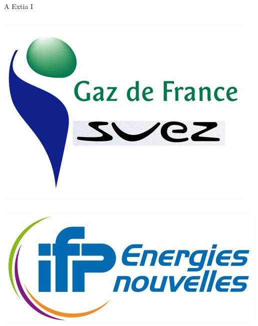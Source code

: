 \documentclass[xcolor=dvipsnames]{beamer}
\begin{document}
\begin{frame}{A Extia I}
\begin{itemize}
\begin{columns}
  \begin{column}{0.3\textwidth}
    \centerline{\includegraphics[scale=0.2]{img/gdf.jpeg}}
  \end{column}
\end{columns}
\begin{center}
    \includegraphics[scale=0.2]{img/ifp.jpeg}
\end{center}

\end{itemize}
\end{frame}
\end{document}
